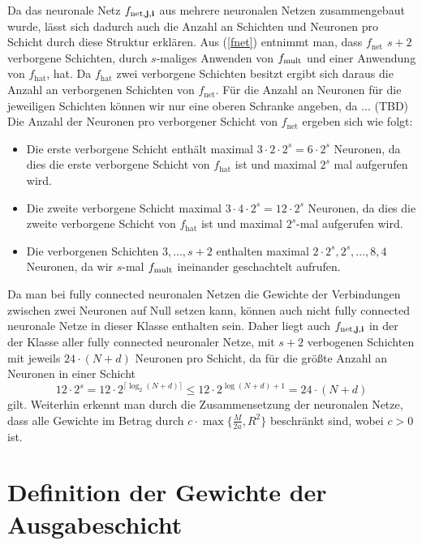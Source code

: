 Da das neuronale Netz $f_{\mathrm{net},\mathbf{j},\mathbf{i}}$ aus mehrere neuronalen Netzen zusammengebaut wurde, lässt sich dadurch auch die Anzahl an Schichten und Neuronen pro Schicht durch diese Struktur erklären. Aus (\ref{fnet}) entnimmt man, dass $f_{\mathrm{net}}$ $s + 2$ verborgene Schichten, durch $s$-maliges Anwenden von $f_{\mathrm{mult}}$ und einer Anwendung von $f_{\mathrm{hat}}$, hat. Da $f_{\mathrm{hat}}$ zwei verborgene Schichten besitzt ergibt sich daraus die Anzahl an verborgenen Schichten von $f_{\mathrm{net}}$. Für die Anzahl an Neuronen für die jeweiligen Schichten können wir nur eine oberen Schranke angeben, da ... (TBD)
Die Anzahl der Neuronen pro verborgener Schicht von $f_{\mathrm{net}}$ ergeben sich wie folgt:
\begin{itemize}
\item Die erste verborgene Schicht enthält maximal $3 \cdot 2 \cdot 2^s = 6 \cdot 2^s$ Neuronen, da dies die erste verborgene Schicht von $f_{\mathrm{hat}}$ ist und maximal $2^s$ mal aufgerufen wird. 
\item Die zweite verborgene Schicht maximal $3 \cdot 4 \cdot 2^s = 12\cdot 2^s$ Neuronen, da dies die zweite verborgene Schicht von $f_{\mathrm{hat}}$ ist und maximal $2^s$-mal aufgerufen wird.
\item Die verborgenen Schichten $3,\dots,s + 2$ enthalten maximal   $2 \cdot 2^s, 2^s, \dots, 8, 4$ Neuronen, da wir $s$-mal $f_{\mathrm{mult}}$ ineinander geschachtelt aufrufen. 
\end{itemize}  
Da man bei fully connected neuronalen Netzen die Gewichte der Verbindungen zwischen zwei Neuronen auf Null setzen kann, können auch nicht fully connected neuronale Netze in dieser Klasse enthalten sein. Daher liegt auch $f_{\mathrm{net},\mathbf{j},\mathbf{i}}$ in der der Klasse aller fully connected neuronaler Netze, mit $s + 2$ verbogenen Schichten mit jeweils $24 \cdot (N + d)$ Neuronen pro Schicht, da für die größte Anzahl an Neuronen in einer Schicht $$12 \cdot 2^s = 12 \cdot 2^{\lceil\log_2(N + d)\rceil} \leq 12 \cdot 2^{\log(N + d) + 1} = 24 \cdot (N + d)$$ gilt. Weiterhin erkennt man durch die Zusammensetzung der neuronalen Netze, dass alle Gewichte im Betrag durch $c \cdot \max\{\frac{M}{2a}, R^2\}$ beschränkt sind, wobei $c > 0$ ist. 

\section{Definition der Gewichte der Ausgabeschicht}
\label{subsec:2.2}

